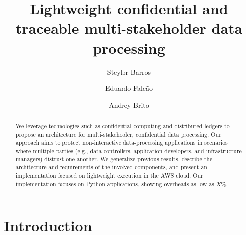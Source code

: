 \documentclass[runningheads]{llncs}
\begin{document}
\title{Lightweight confidential and traceable multi-stakeholder data processing}

\author{Steylor Barros \and
Eduardo Falcão \and Andrey Brito}


\maketitle

\begin{abstract}
We leverage technologies such as confidential computing and distributed ledgers to propose an architecture for multi-stakeholder, confidential data processing. Our approach aims to protect non-interactive data-processing applications in scenarios where multiple parties (e.g., data controllers, application developers, and infrastructure managers) distrust one another. We generalize previous results, describe the architecture and requirements of the involved components, and present an implementation focused on lightweight execution in the AWS cloud. Our implementation focuses on Python applications, showing overheads as low as $X\%$.


\end{abstract}

\section{Introduction}
\end{document}
